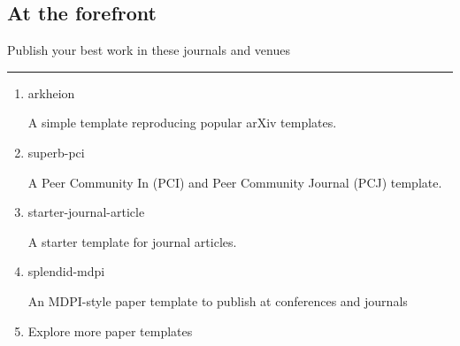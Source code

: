 \subsection{At the forefront}\label{at-the-forefront}

Publish your best work in these journals and venues

\begin{center}\rule{0.5\linewidth}{0.5pt}\end{center}

\begin{enumerate}
\item
  \href{https://typst.app/universe/package/arkheion/}{}

  

  arkheion

  A simple template reproducing popular arXiv templates.
\item
  \href{https://typst.app/universe/package/superb-pci/}{}

  

  superb-pci

  A Peer Community In (PCI) and Peer Community Journal (PCJ) template.
\item
  \href{https://typst.app/universe/package/starter-journal-article/}{}

  

  starter-journal-article

  A starter template for journal articles.
\item
  \href{https://typst.app/universe/package/splendid-mdpi/}{}

  

  splendid-mdpi

  An MDPI-style paper template to publish at conferences and journals
\item
  \href{/universe/search/?category=paper}{}

  Explore more paper templates
\end{enumerate}

